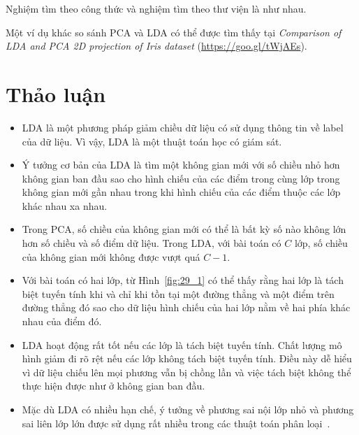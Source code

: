 Nghiệm tìm theo công thức và nghiệm tìm theo thư viện là như nhau.

Một ví dụ khác so sánh PCA và LDA có thể được tìm thấy tại \textit{Comparison of LDA
and PCA 2D projection of Iris dataset} (\url{https://goo.gl/tWjAEs}).

\newpage
\section{Thảo luận}

\begin{itemize}
\item LDA là một phương pháp giảm chiều dữ liệu có sử dụng thông tin về
label của dữ liệu. Vì vậy, LDA là một thuật toán học có giám sát.

\item Ý tưởng cơ bản của LDA là tìm một không gian mới với số chiều nhỏ hơn
không gian ban đầu sao cho hình chiếu của các điểm trong cùng lớp trong không gian mới gần nhau trong khi hình chiếu của các điểm thuộc các lớp khác
nhau xa nhau.

\item Trong PCA, số chiều của không gian mới có thể là bất kỳ số nào không lớn hơn số chiều và số điểm dữ liệu. Trong LDA, với bài toán có $C$
lớp, số chiều của không gian mới không được vượt quá $C-1$.

\item Với bài toán có hai lớp, từ Hình~\ref{fig:29_1} có thể thấy rằng
hai lớp
là tách biệt tuyến tính khi và chỉ khi tồn tại một đường thẳng và một điểm
trên đường thẳng đó sao cho dữ liệu hình chiếu của hai lớp nằm về hai phía khác nhau của điểm đó.

\item LDA hoạt động rất tốt nếu các lớp là tách biệt tuyến tính. Chất lượng mô
hình giảm đi rõ rệt nếu các lớp không tách biệt tuyến tính. Điều này dễ
hiểu vì dữ liệu chiếu lên mọi phương vẫn bị chồng lần và việc
tách biệt không thể thực hiện được như ở không gian ban đầu.

\item Mặc dù LDA có nhiều hạn chế, ý tưởng về phương sai nội lớp nhỏ và phương sai liên lớp lớn được sử dụng rất nhiều trong các
thuật toán phân loại~\cite{vu2016fast,vu2016learning,Meng2011FDDL}.

\end{itemize}

